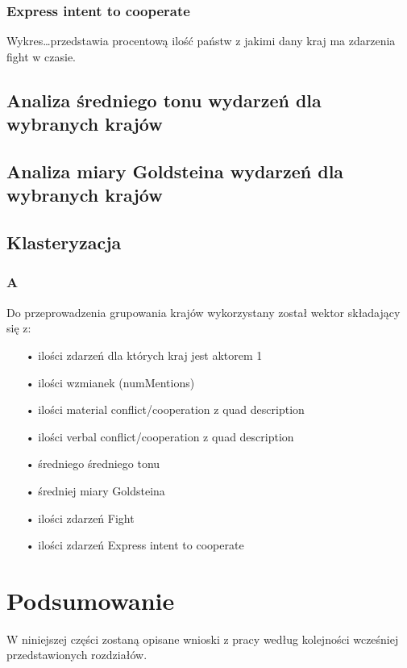 \documentclass[11pt]{report}
\begin{document}
    \subsection{Express intent to cooperate}

    Wykres\ldots przedstawia procentową ilość państw z jakimi dany kraj ma zdarzenia fight w czasie.


    \section{Analiza średniego tonu wydarzeń dla wybranych krajów}


    \section{Analiza miary Goldsteina wydarzeń dla wybranych krajów}


    \section{Klasteryzacja}

    \subsection{A}
    Do przeprowadzenia grupowania krajów wykorzystany został wektor składający się z:
    \begin{enumerate}
        \item[•] ilości zdarzeń dla których kraj jest aktorem 1
        \item[•] ilości wzmianek (numMentions)
        \item[•] ilości material conflict/cooperation z quad description
        \item[•] ilości verbal conflict/cooperation z quad description
        \item[•] średniego średniego tonu
        \item[•] średniej miary Goldsteina
        \item[•] ilości zdarzeń Fight
        \item[•] ilości zdarzeń Express intent to cooperate
    \end{enumerate}


    \chapter{Podsumowanie}
    W niniejszej części zostaną opisane wnioski z pracy według kolejności wcześniej przedstawionych rozdziałów.
\end{document}
